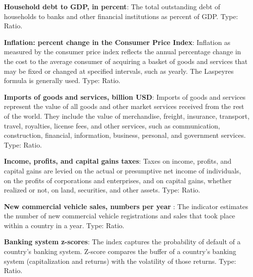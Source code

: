 \documentclass[11pt]{article}
\begin{document}
\begin{appendices}
\textbf{Household debt to GDP, in percent}: The total outstanding debt of households to banks and other financial institutions as percent of GDP. Type: Ratio.

\textbf{Inflation: percent change in the Consumer Price Index}: Inflation as measured by the consumer price index reflects the annual percentage change in the cost to the average consumer of acquiring a basket of goods and services that may be fixed or changed at specified intervals, such as yearly. The Laspeyres formula is generally used. Type: Ratio.

\textbf{Imports of goods and services, billion USD}: Imports of goods and services represent the value of all goods and other market services received from the rest of the world. They include the value of merchandise, freight, insurance, transport, travel, royalties, license fees, and other services, such as communication, construction, financial, information, business, personal, and government services. Type: Ratio.

\textbf{Income, profits, and capital gains taxes}: Taxes on income, profits, and capital gains are levied on the actual or presumptive net income of individuals, on the profits of corporations and enterprises, and on capital gains, whether realized or not, on land, securities, and other assets. Type: Ratio.

\textbf{New commercial vehicle sales, numbers per year }: The indicator estimates the number of new commercial vehicle registrations and sales that took place within a country in a year. Type: Ratio.

\textbf{Banking system z-scores}: The index captures the probability of default of a country's banking system. Z-score compares the buffer of a country's banking system (capitalization and returns) with the volatility of those returns. Type: Ratio.

\end{appendices}
\end{document}
